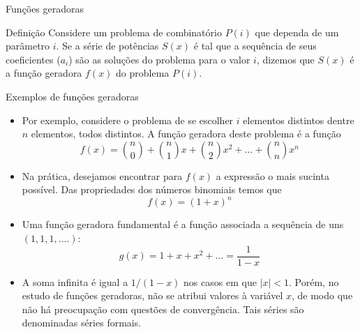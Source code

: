 \begin{frame}[fragile]{Funções geradoras}

    \begin{block}{Definição}
        Considere um problema de combinatório $P(i)$ que dependa de um parâmetro $i$. Se a série de 
potências $S(x)$ é tal que a sequência de seus coeficientes ($a_i$) são as soluções do problema
para o valor $i$, dizemos que $S(x)$ é a função geradora $f(x)$ do problema $P(i)$.
    \end{block}

\end{frame}

\begin{frame}[fragile]{Exemplos de funções geradoras}

    \begin{itemize}
        \item Por exemplo, considere o problema de se escolher $i$ elementos distintos dentre $n$ elementos,
        todos distintos. A função geradora deste problema é a função
        \[
        f(x) = \binom{n}{0} + \binom{n}{1}x + \binom{n}{2}x^2 + \ldots + \binom{n}{n}x^n
        \]

        \item Na prática, desejamos encontrar para $f(x)$ a expressão o mais sucinta possível. Das propriedades dos números binomiais temos que
        \[
        f(x) = (1 + x)^n
        \]

        \item Uma função geradora fundamental é a função associada a sequência de uns $(1, 1, 1, ....)$:
        \[
        g(x) = 1 + x + x^2 + \ldots = \frac{1}{1 - x}
        \]

        \item A soma infinita é igual a $1/(1 - x)$ nos casos em que $|x| < 1$. Porém, no estudo de funções
geradoras, não se atribui valores à variável $x$, de modo que não há preocupação com questões
de convergência. Tais séries são denominadas séries formais.
    \end{itemize}

\end{frame}
